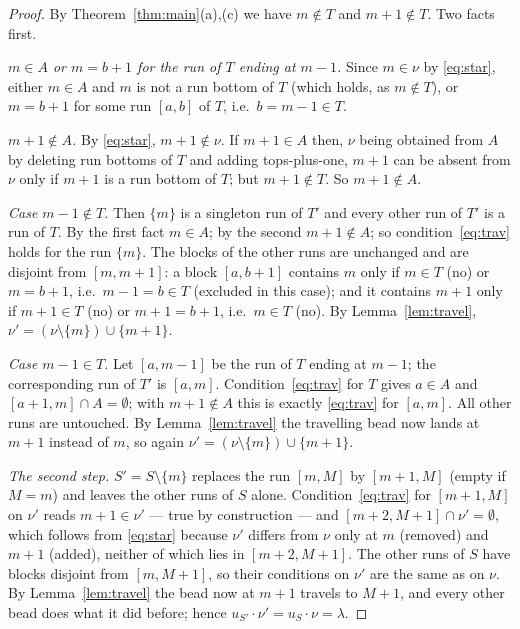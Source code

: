 \documentclass[11pt]{article}
\theoremstyle{plain}
\theoremstyle{definition}
\begin{document}
\begin{proof}
By Theorem~\ref{thm:main}(a),(c) we have $m\notin T$ and $m+1\notin T$. Two facts first.

\emph{$m\in A$ or $m=b+1$ for the run of $T$ ending at $m-1$.} Since $m\in\nu$ by
\eqref{eq:star}, either $m\in A$ and $m$ is not a run bottom of $T$ (which holds, as $m\notin T$),
or $m=b+1$ for some run $[a,b]$ of $T$, i.e.\ $b=m-1\in T$.

\emph{$m+1\notin A$.} By \eqref{eq:star}, $m+1\notin\nu$. If $m+1\in A$ then, $\nu$ being
obtained from $A$ by deleting run bottoms of $T$ and adding tops-plus-one, $m+1$ can be absent
from $\nu$ only if $m+1$ is a run bottom of $T$; but $m+1\notin T$. So $m+1\notin A$.

\emph{Case $m-1\notin T$.} Then $\{m\}$ is a singleton run of $T'$ and every other run of $T'$
is a run of $T$. By the first fact $m\in A$; by the second $m+1\notin A$; so
condition~\eqref{eq:trav} holds for the run $\{m\}$. The blocks of the other runs are unchanged
and are disjoint from $[m,m+1]$: a block $[a,b+1]$ contains $m$ only if $m\in T$ (no) or
$m=b+1$, i.e.\ $m-1=b\in T$ (excluded in this case); and it contains $m+1$ only if $m+1\in T$
(no) or $m+1=b+1$, i.e.\ $m\in T$ (no). By Lemma~\ref{lem:travel},
$\nu'=(\nu\setminus\{m\})\cup\{m+1\}$.

\emph{Case $m-1\in T$.} Let $[a,m-1]$ be the run of $T$ ending at $m-1$; the corresponding run
of $T'$ is $[a,m]$. Condition~\eqref{eq:trav} for $T$ gives $a\in A$ and
$[a+1,m]\cap A=\emptyset$; with $m+1\notin A$ this is exactly \eqref{eq:trav} for $[a,m]$. All
other runs are untouched. By Lemma~\ref{lem:travel} the travelling bead now lands at $m+1$
instead of $m$, so again $\nu'=(\nu\setminus\{m\})\cup\{m+1\}$.

\emph{The second step.} $S'=S\setminus\{m\}$ replaces the run $[m,M]$ by $[m+1,M]$ (empty if
$M=m$) and leaves the other runs of $S$ alone. Condition~\eqref{eq:trav} for $[m+1,M]$ on $\nu'$
reads $m+1\in\nu'$ --- true by construction --- and $[m+2,M+1]\cap\nu'=\emptyset$, which follows
from \eqref{eq:star} because $\nu'$ differs from $\nu$ only at $m$ (removed) and $m+1$ (added),
neither of which lies in $[m+2,M+1]$. The other runs of $S$ have blocks disjoint from
$[m,M+1]$, so their conditions on $\nu'$ are the same as on $\nu$. By Lemma~\ref{lem:travel} the
bead now at $m+1$ travels to $M+1$, and every other bead does what it did before; hence
$u_{S'}\cdot\nu'=u_S\cdot\nu=\lambda$.
\end{proof}
\end{document}
